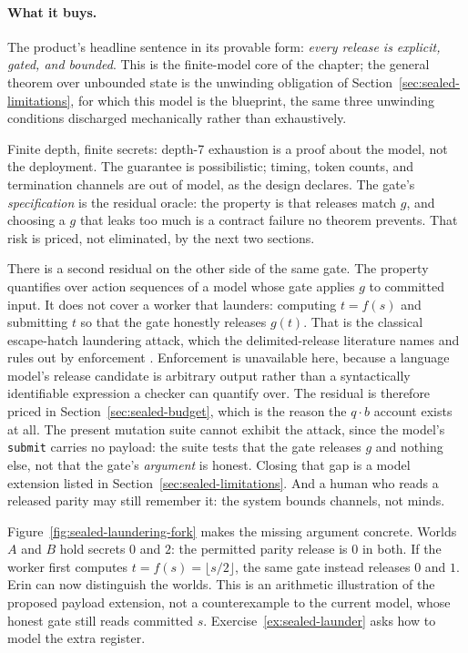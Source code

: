\documentclass[11pt,a4paper]{article}
\theoremstyle{definition}
\begin{document}
\paragraph{What it buys.}
The product's headline sentence in its provable form: \emph{every release is
explicit, gated, and bounded}. This is the finite-model core of the chapter;
the general theorem over unbounded state is the unwinding obligation of
Section~\ref{sec:sealed-limitations}, for which this model is the blueprint,
the same three unwinding conditions discharged mechanically rather than
exhaustively.

\begin{pdboundary}
\setlength{\parskip}{4pt plus 1pt}
Finite depth, finite secrets: depth-7 exhaustion is a proof about the model,
not the deployment. The guarantee is possibilistic; timing, token counts, and
termination channels are out of model, as the design declares. The gate's
\emph{specification} is the residual oracle: the property is that releases
match $g$, and choosing a $g$ that leaks too much is a contract failure no
theorem prevents. That risk is priced, not eliminated, by the next two
sections.

There is a second residual on the other side of the same gate. The property
quantifies over action sequences of a model whose gate applies $g$ to committed
input. It does not cover a worker that launders: computing $t=f(s)$ and
submitting $t$ so that the gate honestly releases $g(t)$. That is the classical
escape-hatch laundering attack, which the delimited-release literature names
and rules out by enforcement . Enforcement is unavailable here,
because a language model's release candidate is arbitrary output rather than a
syntactically identifiable expression a checker can quantify over. The
residual is therefore priced in Section~\ref{sec:sealed-budget}, which is the
reason the $q\cdot b$ account exists at all. The present mutation suite cannot
exhibit the attack, since the model's \texttt{submit} carries no payload: the
suite tests that the gate releases $g$ and nothing else, not that the gate's
\emph{argument} is honest. Closing that gap is a model extension listed in
Section~\ref{sec:sealed-limitations}. And a human who reads a released parity
may still remember it: the system bounds channels, not minds.
\end{pdboundary}

Figure~\ref{fig:sealed-laundering-fork} makes the missing argument concrete.
Worlds $A$ and $B$ hold secrets $0$ and $2$: the permitted parity release is
$0$ in both. If the worker first computes $t=f(s)=\lfloor s/2\rfloor$, the
same gate instead releases $0$ and $1$. Erin can now distinguish the worlds.
This is an arithmetic illustration of the proposed payload extension, not a
counterexample to the current model, whose honest gate still reads committed
$s$. Exercise~\ref{ex:sealed-launder} asks how to model the extra register.
\end{document}
